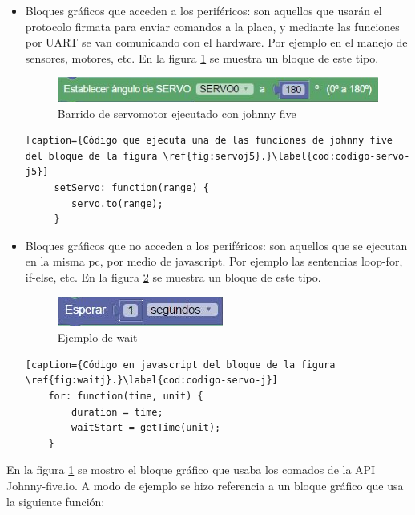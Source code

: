 \begin{itemize}
	\item Bloques gráficos que acceden a los periféricos: son aquellos que usarán el protocolo firmata para enviar comandos a la placa, y mediante las funciones por UART se van comunicando con el hardware. Por ejemplo en el manejo de sensores, motores, etc. En la figura \ref{fig:servoj5} se muestra un bloque de este tipo.
	
	
	\begin{figure}[!htbp]
		\centering
		\includegraphics[scale=.60]{./Figures/ejemplo-servo-j5.PNG}
		\caption{Barrido de servomotor ejecutado con johnny five}
		\label{fig:servoj5}
	\end{figure}
   
    \begin{lstlisting}[caption={Código que ejecuta una de las funciones de johnny five del bloque de la figura \ref{fig:servoj5}.}\label{cod:codigo-servo-j5}] 
     setServo: function(range) {
        servo.to(range);
     }
    \end{lstlisting}
	
	\item Bloques gráficos que no acceden a los periféricos: son aquellos que se ejecutan en la misma pc, por medio de javascript. Por ejemplo las sentencias loop-for, if-else, etc.  En la figura \ref{fig:waitj} se muestra un bloque de este tipo.
	
	\begin{figure}[!htbp]
		\centering
		\includegraphics[scale=.60]{./Figures/ejemplo-servo-j.PNG}
		\caption{Ejemplo de wait}
		\label{fig:waitj}
	\end{figure}

	\begin{lstlisting}[caption={Código en javascript del bloque de la figura \ref{fig:waitj}.}\label{cod:codigo-servo-j}] 
	for: function(time, unit) {
		duration = time;
		waitStart = getTime(unit);
	}
	\end{lstlisting}
\end{itemize}

En la figura \ref{fig:servoj5} se mostro el bloque gráfico que usaba los comados de la API Johnny-five.io. A modo de ejemplo se hizo referencia a un bloque gráfico que usa la siguiente función: 

